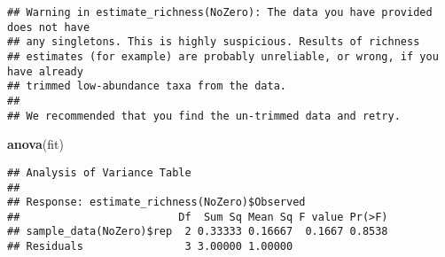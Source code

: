 \documentclass[]{article}
\newenvironment{Shaded}{\begin{snugshade}}{\end{snugshade}}
\newcommand{\KeywordTok}[1]{\textcolor[rgb]{0.13,0.29,0.53}{\textbf{#1}}}
\newcommand{\StringTok}[1]{\textcolor[rgb]{0.31,0.60,0.02}{#1}}
\newcommand{\CommentTok}[1]{\textcolor[rgb]{0.56,0.35,0.01}{\textit{#1}}}
\newcommand{\OperatorTok}[1]{\textcolor[rgb]{0.81,0.36,0.00}{\textbf{#1}}}
\newcommand{\NormalTok}[1]{#1}
\begin{document}
\begin{Shaded}
\end{Shaded}

\begin{verbatim}
## Warning in estimate_richness(NoZero): The data you have provided does not have
## any singletons. This is highly suspicious. Results of richness
## estimates (for example) are probably unreliable, or wrong, if you have already
## trimmed low-abundance taxa from the data.
## 
## We recommended that you find the un-trimmed data and retry.
\end{verbatim}

\begin{Shaded}
\begin{Highlighting}[]
\KeywordTok{anova}\NormalTok{(fit)}
\end{Highlighting}
\end{Shaded}

\begin{verbatim}
## Analysis of Variance Table
## 
## Response: estimate_richness(NoZero)$Observed
##                         Df  Sum Sq Mean Sq F value Pr(>F)
## sample_data(NoZero)$rep  2 0.33333 0.16667  0.1667 0.8538
## Residuals                3 3.00000 1.00000
\end{verbatim}
\end{document}
